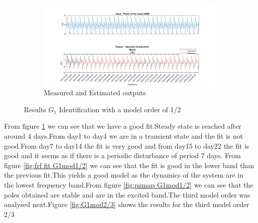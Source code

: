 \documentclass[a4paper,12pt]{article}
\numberwithin{equation}{section}
\begin{document}
\begin{figure}[H]
\begin{subfigure}{\textwidth}
  \centering
  \includegraphics[scale=0.38]{G1mod12InOut.png}
  \caption{Measured and Estimated outputs}
  \label{fig:inoutG11/2}
\end{subfigure}
\caption{Results $G_{1}$ Identification with a model order of 1/2 }
\label{fig:G1mod1/2}
\end{figure}

\noindent
From figure \ref{fig:inoutG11/2} we can see that we have a good fit.Steady state is reached after around 4 days.From day1 to day4 we are in a transient state and the fit is not good.From day7 to day14 the fit is very good and from day15 to day22 the fit is good and it seems as if there is a periodic disturbance of period 7 days. From figure \ref{fig:frf fit G1mod1/2} we can see that the fit is good in the lower band than the previous fit.This yields a good model as the dynamics of the system are in the lowest frequency band.From figure \ref{fig:pzmap G1mod1/2} we can see that the poles obtained are stable and are in the excited band.The third model order was analysed next.Figure \ref{fig:G1mod2/3} shows the results for the third model order 2/3 
\end{document}
